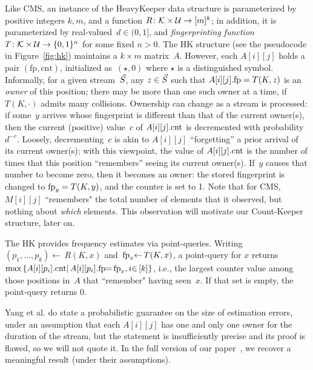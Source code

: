 \noindent Like CMS, an instance of the HeavyKeeper data structure is parameterized by positive integers $k,m$, and a function $R\colon \mathcal{K}\times\mathcal{U}\to[m]^k$; in addition, it is parameterized by real-valued~$d \in (0,1]$, and \emph{fingerprinting function} $T\colon\mathcal{K}\times\mathcal{U}\to\{0,1\}^n$ for some fixed $n>0$.
The HK structure (see the pseudocode in Figure~\ref{fig:hk}) maintains a $k \times m$ matrix~$A$. However, each $A[i][j]$ holds a pair $(\mathrm{fp},\mathrm{cnt})$, initialized as~$(\star,0)$ where $\star$ is a distinguished symbol.  Informally, for a given stream~$\vec{S}$, any $z \in \vec{S}$ such that $A[i][j].\textup{fp}=T(K,z)$ is an \emph{owner} of this position; there may be more than one such owner at a time, if $T(K,\cdot)$ admits many collisions. Ownership can change as a stream is processed: if some~$y$ arrives whose fingerprint is different than that of the current owner(s), then the current (positive) value~$c$ of $A[i][j].\textup{cnt}$ is decremented with probability $d^{-c}$.  Loosely, decrementing~$c$ is akin to $A[i][j]$ ``forgetting'' a prior arrival of its current owner(s); with this viewpoint, the value of $A[i][j].\textup{cnt}$ is the number of times that this position ``remembers'' seeing its current owner(s).  If~$y$ causes that number to become zero, then it becomes an owner: the stored fingerprint is changed to $\textup{fp}_y=T(K,y)$, and the counter is set to 1.  Note that for CMS, $M[i][j]$ ``remembers" the total number of elements that it observed, but nothing about \emph{which} elements.  This observation will motivate our Count-Keeper structure, later on.

The HK provides frequency estimates via point-queries. Writing $(p_1,\allowbreak{\ldots}, p_k) \gets\, R(K,x)$ and~$\textup{fp}_x {\gets}\, T(K,x)$, a point-query for $x$ returns
$
{\max}\left\{A[i][p_i].\textup{cnt}{\mid}\, A[i][p_i].\mathrm{fp}{=}\,\textup{fp}_x{,}\, i{\in}\, [k]\right\}
$, i.e., the largest counter value among those positions in~$A$ that ``remember" having seen~$x$.  If that set is empty, the point-query returns 0. 

Yang et al.\cite{yang2019heavykeeper} do state a probabilistic guarantee on the size of estimation errors, under an assumption that each $A[i][j]$ has one and only one owner for the duration of the stream, but the statement is insufficiently precise and its proof is flawed, so we will not quote it.  In the full version of our paper~\cite{cfe_full_version}, we recover a meaningful result (under their assumptions).